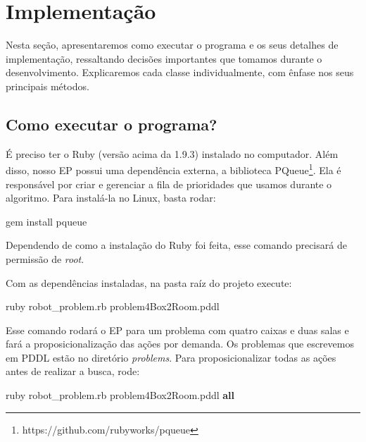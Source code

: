 \documentclass[12pt,a4paper]{article}
\begin{document}
\section{Implementação}\label{implementacao}
Nesta seção, apresentaremos como executar o programa e os seus detalhes de implementação, ressaltando decisões importantes que tomamos durante o desenvolvimento. Explicaremos cada classe individualmente, com ênfase nos seus principais métodos.

\subsection{Como executar o programa?}\label{implementacao:execucao}
É preciso ter o Ruby (versão acima da 1.9.3) instalado no computador. Além disso, nosso EP possui uma dependência externa, a biblioteca PQueue\footnote{https://github.com/rubyworks/pqueue}. Ela é responsável por criar e gerenciar a fila de prioridades que usamos durante o algoritmo. Para instalá-la no Linux, basta rodar:

\begin{center}{gem install pqueue}\end{center}

Dependendo de como a instalação do Ruby foi feita, esse comando precisará de permissão de \textit{root}.

Com as dependências instaladas, na pasta raíz do projeto execute:

\begin{center}{ruby robot\_problem.rb problem4Box2Room.pddl}\end{center}

Esse comando rodará o EP para um problema com quatro caixas e duas salas e fará a proposicionalização das ações por demanda. Os problemas que escrevemos em PDDL estão no diretório \textit{problems}. Para proposicionalizar todas as ações antes de realizar a busca, rode:

\begin{center}{ruby robot\_problem.rb problem4Box2Room.pddl \textbf{all}}\end{center}
\end{document}
